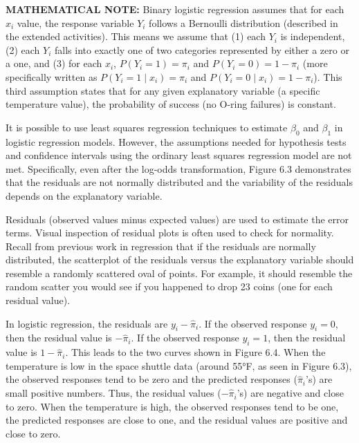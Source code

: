 \documentclass[
]{report}
\begin{document}
\large

\textbf{MATHEMATICAL NOTE:}
Binary logistic regression assumes that for each \(x_i\) value, the response variable \(Y_i\) follows a Bernoulli distribution (described in the extended activities). This means we assume that (1) each \(Y_i\) is independent, (2) each \(Y_i\) falls into exactly one of two categories represented by either a zero or a one, and (3) for each \(x_i\), \(P(Y_i = 1) = \pi_i\) and \(P(Y_i = 0) = 1 - \pi_i\) (more specifically written as \(P(Y_i = 1 \mid x_i) = \pi_i\) and \(P(Y_i = 0 \mid x_i) = 1 - \pi_i\)). This third assumption states that for any given explanatory variable (a specific temperature value), the probability of success (no O-ring failures) is constant.
\normalsize 

It is possible to use least squares regression techniques to estimate \(\beta_0\) and \(\beta_1\) in logistic regression models. However, the assumptions needed for hypothesis tests and confidence intervals using the ordinary least squares regression model are not met. Specifically, even after the log-odds transformation, Figure 6.3 demonstrates that the residuals are not normally distributed and the variability of the residuals depends on the explanatory variable.

Residuals (observed values minus expected values) are used to estimate the error terms. Visual inspection of residual plots is often used to check for normality. Recall from previous work in regression that if the residuals are normally distributed, the scatterplot of the residuals versus the explanatory variable should resemble a randomly scattered oval of points. For example, it should resemble the random scatter you would see if you happened to drop 23 coins (one for each residual value).

In logistic regression, the residuals are \(y_i - \hat\pi_i\). If the observed response \(y_i = 0\), then the residual value is \(-\hat\pi_i\). If the observed response \(y_i = 1\), then the residual value is \(1 - \hat\pi_i\). This leads to the two curves shown in Figure 6.4. When the temperature is low in the space shuttle data (around 55°F, as seen in Figure 6.3), the observed responses tend to be zero and the predicted responses (\(\hat\pi_i\)'s) are small positive numbers. Thus, the residual values (\(-\hat\pi_i\)'s) are negative and close to zero. When the temperature is high, the observed responses tend to be one, the predicted responses are close to one, and the residual values are positive and close to zero.
\end{document}
